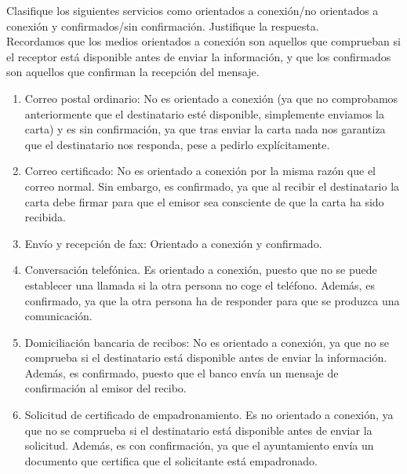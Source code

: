 \begin{ejercicio}
    Clasifique los siguientes servicios como orientados a conexión/no orientados a conexión y confirmados/sin confirmación. Justifique la respuesta.\\

    Recordamos que los medios orientados a conexión son aquellos que comprueban si el receptor está disponible antes de enviar la información, y que los confirmados son aquellos que confirman la recepción del mensaje.
    \begin{enumerate}
        \item Correo postal ordinario: No es orientado a conexión (ya que no comprobamos anteriormente que el destinatario esté disponible, simplemente enviamos la carta) y es sin confirmación, ya que tras enviar la carta nada nos garantiza que el destinatario nos responda, pese a pedirlo explícitamente.
        \item Correo certificado: No es orientado a conexión por la misma razón que el correo normal. Sin embargo, es confirmado, ya que al recibir el destinatario la carta debe firmar para que el emisor sea consciente de que la carta ha sido recibida.
        \item Envío y recepción de fax: Orientado a conexión y confirmado.
        \item Conversación telefónica. Es orientado a conexión, puesto que no se puede establecer una llamada si la otra persona no coge el teléfono. Además, es confirmado, ya que la otra persona ha de responder para que se produzca una comunicación.
        \item Domiciliación bancaria de recibos: No es orientado a conexión, ya que no se comprueba si el destinatario está disponible antes de enviar la información. Además, es confirmado, puesto que el banco envía un mensaje de confirmación al emisor del recibo.
        \item Solicitud de certificado de empadronamiento. Es no orientado a conexión, ya que no se comprueba si el destinatario está disponible antes de enviar la solicitud. Además, es con confirmación, ya que el ayuntamiento envía un documento que certifica que el solicitante está empadronado.
    \end{enumerate}
\end{ejercicio}

